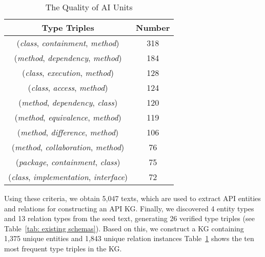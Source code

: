 \begin{table}[t]
\centering
\caption{The Quality of AI Units}
\label{tab: data_details}
\begin{tabular}{c|c}
\hline
Type Triples                           & Number    \\ \hline
(\textit{class}, \textit{containment}, \textit{method})           &  318      \\ \hline
(\textit{method}, \textit{dependency}, \textit{method})           &  184      \\ \hline
(\textit{class}, \textit{execution}, \textit{method})             &  128      \\ \hline
(\textit{class}, \textit{access}, \textit{method})                &  124      \\ \hline
(\textit{method}, \textit{dependency}, \textit{class})            &  120      \\ \hline
(\textit{method}, \textit{equivalence}, \textit{method})          &  119      \\ \hline
(\textit{method}, \textit{difference}, \textit{method})           &  106      \\ \hline
(\textit{method}, \textit{collaboration}, \textit{method})        &  76       \\ \hline
(\textit{package}, \textit{containment}, \textit{class})          &  75       \\ \hline
(\textit{class}, \textit{implementation}, \textit{interface})     &  72       \\ \hline
\end{tabular}
\end{table}

Using these criteria, we obtain 5,047 texts, which are used to extract API entities and relations for constructing an API KG.
Finally, we discovered 4 entity types and 13 relation types from the seed text, generating 26 verified type triples (see Table~\ref{tab: existing schemas}).
Based on this, we construct a KG containing 1,375 unique entities and 1,843 unique relation instances 
Table~\ref{tab: data_details} shows the ten most frequent type triples in the KG.



